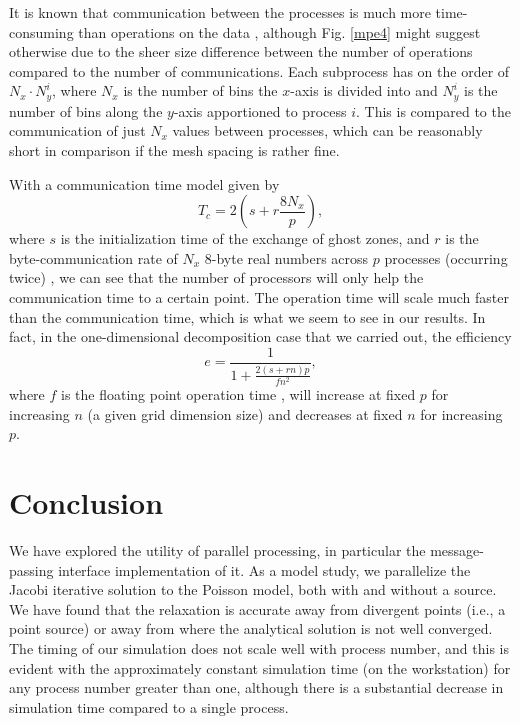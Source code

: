 \documentclass[reprint, amsmath, amssymb, aps, floatfix]{revtex4-1}
\begin{document}
It is known that communication between the processes is much more time-consuming than operations on the data \cite{mpibook}, although Fig. \ref{mpe4} might suggest otherwise due to the sheer size difference between the number of operations compared to the number of communications. Each subprocess has on the order of $N_x\cdot N_y^i$, where $N_x$ is the number of bins the $x$-axis is divided into and $N_y^i$ is the number of bins along the $y$-axis apportioned to process $i$. This is compared to the communication of just $N_x$ values between processes, which can be reasonably short in comparison if the mesh spacing is rather fine.

With a communication time model given by \begin{equation}
T_c = 2\left(s+r\frac{8N_x}{p}\right),
\label{tceq}
\end{equation} where $s$ is the initialization time of the exchange of ghost zones, and $r$ is the byte-communication rate of $N_x$ 8-byte real numbers across $p$ processes (occurring twice) \cite{mpibook}, we can see that the number of processors will only help the communication time to a certain point. The operation time will scale much faster than the communication time, which is what we seem to see in our results. In fact, in the one-dimensional decomposition case that we carried out, the efficiency \begin{equation}
e = \frac{1}{1+\frac{2(s+rn)p}{fn^2}}, \label{eff}
\end{equation} where $f$ is the floating point operation time \cite{mpibook}, will increase at fixed $p$ for increasing $n$ (a given grid dimension size) and decreases at fixed $n$ for increasing $p$.

\section{Conclusion}

We have explored the utility of parallel processing, in particular the message-passing interface implementation of it. As a model study, we parallelize the Jacobi iterative solution to the Poisson model, both with and without a source. We have found that the relaxation is accurate away from divergent points (i.e., a point source) or away from where the analytical solution is not well converged. The timing of our simulation does not scale well with process number, and this is evident with the approximately constant simulation time (on the workstation) for any process number greater than one, although there is a substantial decrease in simulation time compared to a single process.
\end{document}
